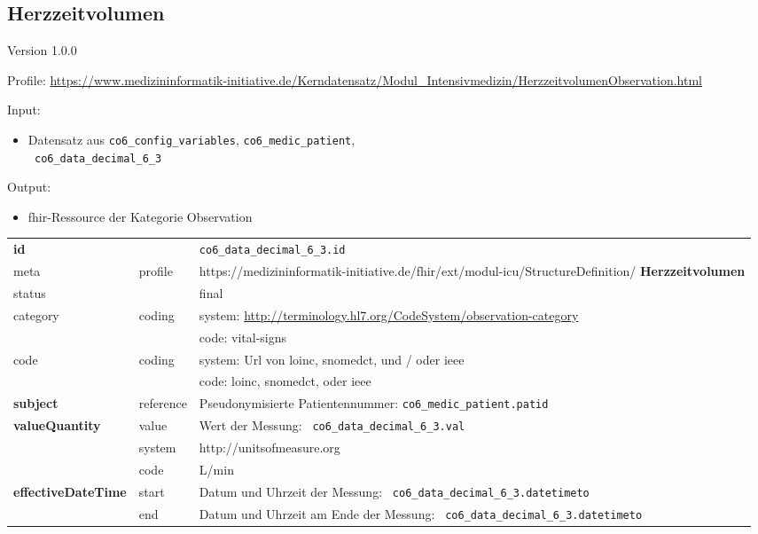 \subsection{Herzzeitvolumen} 
\noindent Version 1.0.0

\noindent Profile: \url{https://www.medizininformatik-initiative.de/Kerndatensatz/Modul_Intensivmedizin/HerzzeitvolumenObservation.html}

\noindent Input:
\begin{itemize}
	\item Datensatz aus \texttt{co6\_config\_variables}, \texttt{co6\_medic\_patient}, \\ \texttt{
co6\_data\_decimal\_6\_3}
\end{itemize}
Output:
\begin{itemize}
        \item \ac{fhir}-Ressource der Kategorie \glqq Observation\grqq{}
\end{itemize}
\begin{longtable}{|l|l|p{7.5cm}|}
        \hline
        \rowcolor{lightgray} \multicolumn{3}{|l|}{Data Mapping (inhaltlich)} \\ \hline
        \textbf{id} &  & \texttt{co6\_data\_decimal\_6\_3.id} \\ \hline
	meta & profile & https://medizininformatik-initiative.de/fhir/ext/modul-icu/StructureDefinition/\textbf{
Herzzeitvolumen} \\ \hline 
	status &  & final   \\ \hline 
	category & coding & system: \url{http://terminology.hl7.org/CodeSystem/observation-category} \\
\cline{3-3}
	& & code: vital-signs \\ \hline
	code & coding & system: Url von \ac{loinc}, \ac{snomedct}, und / oder \ac{ieee} \\ 
	\cline{3-3} 
	 &  & code: \ac{loinc}, \ac{snomedct}, oder \ac{ieee} \\ \hline
	 \textbf{subject}  & reference & Pseudonymisierte Patientennummer: \texttt{co6\_medic\_patient.patid} \\ \hline
	 \textbf{valueQuantity}  & value & Wert der Messung: \texttt{
co6\_data\_decimal\_6\_3.val} \\
        \cline{2-3}
         & system & http://unitsofmeasure.org \\
         \cline{2-3}
         & code &
L/min
\\ \hline
     \textbf{effectiveDateTime}  & start & Datum und Uhrzeit der Messung: \texttt{
co6\_data\_decimal\_6\_3.datetimeto} \\
    \cline{2-3}
     & end & Datum und Uhrzeit am Ende der Messung: \texttt{
co6\_data\_decimal\_6\_3.datetimeto} \\ \hline
\end{longtable}


